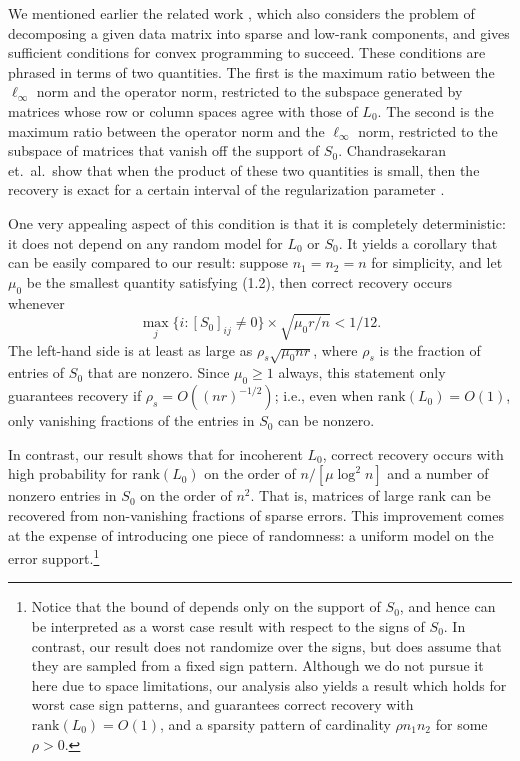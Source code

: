 We mentioned earlier the related work \cite{Venkat-09}, which also considers the problem of decomposing a given data matrix into sparse and low-rank components, and gives sufficient conditions for convex programming to succeed. These conditions are phrased in terms of two quantities. The first is the maximum ratio between the $\ell_\infty$
norm and the operator norm, restricted to the subspace generated by matrices whose row or column spaces agree with those of $L_0$. The second is the maximum ratio between the operator norm and the
$\ell_\infty$ norm, restricted to the subspace of matrices that vanish off the support of $S_0$. Chandrasekaran et.\ al.\ show that when the product of these two quantities is small, then the recovery is exact for a certain interval of the regularization parameter \cite{Venkat-09}.

One very appealing aspect of this condition is that it is completely deterministic: it does not depend on any random model for $L_0$ or $S_0$. It yields a corollary that can be easily compared to our result: suppose $n_1 = n_2 = n$ for simplicity, and let $\mu_0$ be the smallest quantity satisfying (1.2), then correct recovery occurs whenever
\[ 
\max_{j} \{i : [S_0]_{ij} \neq 0\} \times \sqrt{\mu_0 r/n} < 1/12.
\]
The left-hand side is at least as large as $\rho_s \sqrt{\mu_0 n r}$, where $\rho_s$ is the fraction of entries of $S_0$ that are nonzero. Since $\mu_0 \ge 1$ always, this statement only guarantees recovery if $\rho_s = O((nr)^{-1/2})$; i.e., even when
$\mathrm{rank}(L_0) = O(1)$, only vanishing fractions of the entries in $S_0$ can be nonzero.

In contrast, our result shows that for incoherent $L_0$, correct recovery occurs with high probability for $\mathrm{rank}(L_0)$ on the order of $n/[\mu \log^2 n]$ and a number of nonzero entries in $S_0$ on the order of $n^2$. That is, matrices of large rank can be recovered from non-vanishing fractions of sparse errors. This improvement comes at the expense of introducing one piece of randomness: a uniform model on the error support.\footnote{Notice that the bound of \cite{Venkat-09} depends only on the support of $S_0$, and hence can be interpreted as a worst case result with respect to the signs of $S_0$. In contrast, our result does not randomize over the signs, but does assume that they are sampled from a fixed sign pattern. Although we do not pursue it here due to space limitations, our analysis also yields a result which holds for worst case sign patterns, and guarantees correct recovery with $\mathrm{rank}(L_0) = O(1)$, and a sparsity pattern of cardinality $\rho n_1 n_2$ for some $\rho
> 0$.}

